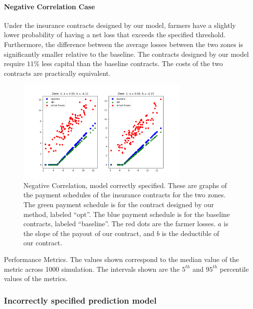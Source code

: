 \documentclass[11pt]{article}
\begin{document}
      \paragraph{Negative Correlation Case} Under the insurance contracts designed by our model, farmers have a slightly lower probability of having a net loss that exceeds the specified threshold. Furthermore, the difference between the average losses between the two zones is significantly smaller relative to the baseline. The contracts designed by our model require $11\%$ less capital than the baseline contracts. The costs of the two contracts are practically equivalent. 
      \begin{figure}[H]
          \centering
          \includegraphics[width=0.75\textwidth]{../../output/figures/Bootstrap/neg_corr_linear.png}
          \caption{Negative Correlation, model correctly specified. These are graphs of the payment schedules of the insurance contracts for the two zones. The green payment schedule is for the contract designed by our method, labeled ``opt''. The blue payment schedule is for the baseline contracts, labeled ``baseline''. The red dots are the farmer losses. $a$ is the slope of the payout of our contract, and $b$ is the deductible of our contract.}
      \end{figure}

      \begin{table}[H]
          \centering
          \small
          \caption{Performance Metrics. The values shown correspond to the median value of the metric across 1000 simulation. The intervals shown are the $5^{th}$ and $95^{th}$ percentile values of the metrics.}
          
      \end{table}
      \FloatBarrier

    \subsubsection{Incorrectly specified prediction model}
\end{document}
